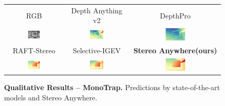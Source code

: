 \documentclass[10pt,twocolumn,letterpaper]{article}
\newcommand{\method}[0]{Stereo Anywhere\xspace}
\begin{document}
\begin{figure}[h]
\begin{tabular}{ccc}
        \small RGB &
        \small Depth Anything v2 \cite{depth_anything_v2} &
        \small DepthPro \cite{depthpro} \\
        \includegraphics[width=0.23\textwidth]{imgs/monotrap/rgb/25.jpg} & 
        \includegraphics[width=0.23\textwidth]{imgs/monotrap/mono/dav2/25.jpg}  &
        \includegraphics[width=0.23\textwidth]{imgs/monotrap/mono/depthpro/25.jpg} \\
        \small RAFT-Stereo \cite{lipson2021raft} &
        \small Selective-IGEV \cite{wang2024selective} &      
        \textbf{\method (ours)} \\
        \includegraphics[width=0.23\textwidth]{imgs/monotrap/stereo/RAFT-Stereo/25.jpg} &
        \includegraphics[width=0.23\textwidth]{imgs/monotrap/stereo/Selective/25.jpg} &
        \includegraphics[width=0.23\textwidth]{imgs/monotrap/ours/25.jpg} \\ 
    \end{tabular}\vspace{-0.3cm}
    \caption{\textbf{Qualitative Results -- MonoTrap.} Predictions by state-of-the-art models and \method.}
    \label{fig:qual_monotrap2}\vspace{-0.3cm}
\end{figure}
\end{document}
